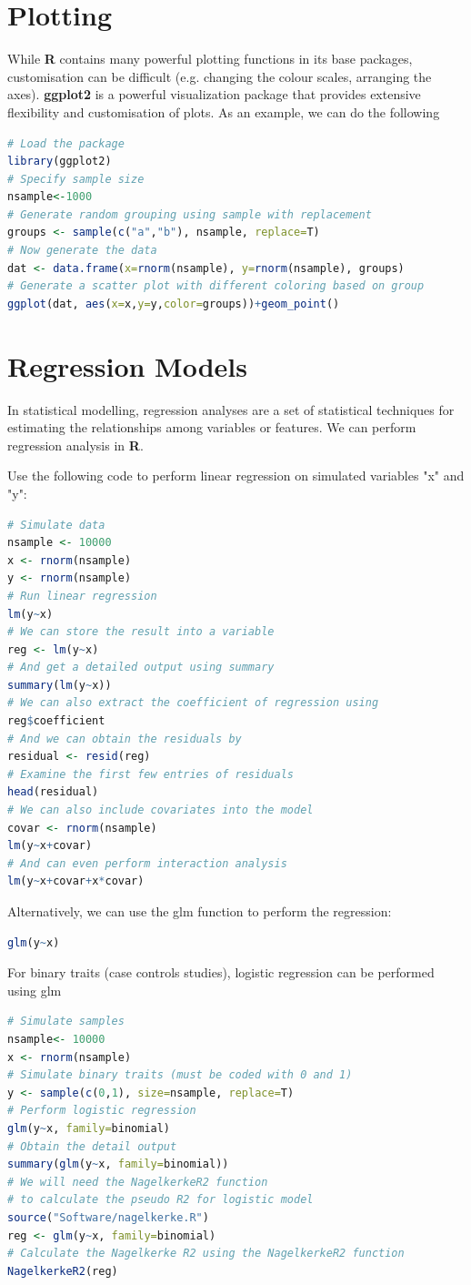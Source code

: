 \documentclass[12pt,openany]{scrbook}
\begin{document}
\section{Plotting}
While \textbf{R} contains many powerful plotting functions in its base packages, customisation can be difficult (e.g. changing the colour scales, arranging the axes).
\textbf{ggplot2} is a powerful visualization package that provides extensive flexibility and customisation of plots.
As an example, we can do the following
\begin{lstlisting}[language=R]
# Load the package
library(ggplot2)
# Specify sample size
nsample<-1000
# Generate random grouping using sample with replacement
groups <- sample(c("a","b"), nsample, replace=T)
# Now generate the data
dat <- data.frame(x=rnorm(nsample), y=rnorm(nsample), groups)
# Generate a scatter plot with different coloring based on group
ggplot(dat, aes(x=x,y=y,color=groups))+geom_point()
\end{lstlisting}

\section{Regression Models}
In statistical modelling, regression analyses are a set of statistical techniques for estimating the relationships among variables or features. We can perform regression analysis in \textbf{R}.

\noindent Use the following code to perform linear regression on simulated variables "x" and "y": 
\begin{lstlisting}[language=R]
# Simulate data
nsample <- 10000
x <- rnorm(nsample)
y <- rnorm(nsample)
# Run linear regression
lm(y~x)
# We can store the result into a variable
reg <- lm(y~x)
# And get a detailed output using summary
summary(lm(y~x))
# We can also extract the coefficient of regression using 
reg$coefficient
# And we can obtain the residuals by 
residual <- resid(reg)
# Examine the first few entries of residuals
head(residual)
# We can also include covariates into the model
covar <- rnorm(nsample)
lm(y~x+covar)
# And can even perform interaction analysis
lm(y~x+covar+x*covar)
\end{lstlisting}

\noindent Alternatively, we can use the glm function to perform the regression:
\begin{lstlisting}[language=R]
glm(y~x)
\end{lstlisting}

\noindent For binary traits (case controls studies), logistic regression can be performed using \gls{glm}
\begin{lstlisting}[language=R]
# Simulate samples
nsample<- 10000
x <- rnorm(nsample)
# Simulate binary traits (must be coded with 0 and 1)
y <- sample(c(0,1), size=nsample, replace=T)
# Perform logistic regression
glm(y~x, family=binomial)
# Obtain the detail output
summary(glm(y~x, family=binomial))
# We will need the NagelkerkeR2 function
# to calculate the pseudo R2 for logistic model
source("Software/nagelkerke.R")
reg <- glm(y~x, family=binomial)
# Calculate the Nagelkerke R2 using the NagelkerkeR2 function
NagelkerkeR2(reg)
\end{lstlisting}
\end{document}

